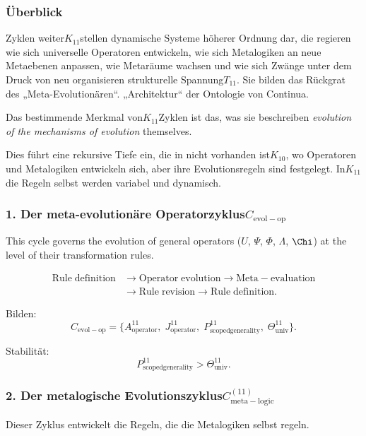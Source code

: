 \subsubsection{Überblick}

Zyklen weiter$K_{11}$stellen dynamische Systeme höherer Ordnung dar, die regieren
wie sich universelle Operatoren entwickeln, wie sich Metalogiken an neue Metaebenen anpassen,
wie Metaräume wachsen und wie sich Zwänge unter dem Druck von neu organisieren
strukturelle Spannung$T_{11}$. Sie bilden das Rückgrat des „Meta-Evolutionären“.
„Architektur“ der Ontologie von Continua.

Das bestimmende Merkmal von$K_{11}$Zyklen ist das, was sie beschreiben
\emph{evolution of the mechanisms of evolution} themselves.

Dies führt eine rekursive Tiefe ein, die in nicht vorhanden ist$K_{10}$, wo Operatoren
und Metalogiken entwickeln sich, aber ihre Evolutionsregeln sind festgelegt.
In$K_{11}$die Regeln selbst werden variabel und dynamisch.


\subsubsection{1. Der meta-evolutionäre Operatorzyklus$C_{\mathrm{evol-op}}$}

This cycle governs the evolution of general operators ($U$, $\Psi$, $\Phi$,
$\Lambda$, $\Chi$) at the level of their transformation rules.

\[
  \begin{aligned}
  \mathrm{Rule\;definition}
  &\to \mathrm{Operator\;evolution}
  \to \mathrm{Meta\!-\!evaluation}\\
  &\to \mathrm{Rule\;revision}
  \to \mathrm{Rule\;definition}.
  \end{aligned}
\]

Bilden:
\[
  C_{\mathrm{evol-op}}
  =
  \{
    A^{11}_{\mathrm{operator}},\;
    J^{11}_{\mathrm{operator}},\;
    P^{11}_{\mathrm{scoped generality}},\;
    \Theta^{11}_{\mathrm{univ}}
  \}.
\]

Stabilität:
\[
  P^{11}_{\mathrm{scoped generality}}>\Theta^{11}_{\mathrm{univ}}.
\]


\subsubsection{2. Der metalogische Evolutionszyklus$C_{\mathrm{meta\!-\!logic}}^{(11)}$}

Dieser Zyklus entwickelt die Regeln, die die Metalogiken selbst regeln.

